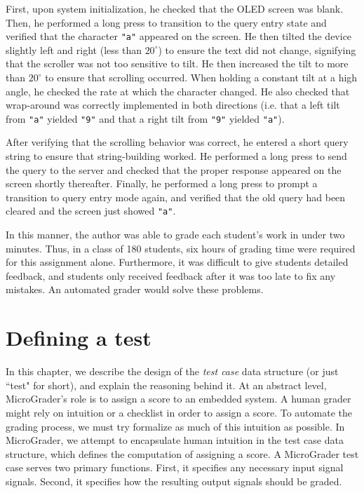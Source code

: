 \documentclass[12pt]{article}
\begin{document}
First, upon system initialization, he checked that the OLED screen was blank.  Then, he performed a long press to transition to the query entry state and verified that the character \texttt{"a"} appeared on the screen.  He then tilted the device slightly left and right (less than $20^{\circ}$) to ensure the text did not change, signifying that the scroller was not too sensitive to tilt.  He then increased the tilt to more than $20^{\circ}$ to ensure that scrolling occurred.  When holding a constant tilt at a high angle, he checked the rate at which the character changed.  He also checked that wrap-around was correctly implemented in both directions (i.e. that a left tilt from \texttt{"a"} yielded \texttt{"9"} and that a right tilt from \texttt{"9"} yielded \texttt{"a"}).

After verifying that the scrolling behavior was correct, he entered a short query string to ensure that string-building worked.  He performed a long press to send the query to the server and checked that the proper response appeared on the screen shortly thereafter.  Finally, he performed a long press to prompt a transition to query entry mode again, and verified that the old query had been cleared and the screen just showed \texttt{"a"}.

In this manner, the author was able to grade each student's work in under two minutes.  Thus, in a class of 180 students, six hours of grading time were required for this assignment alone.  Furthermore, it was difficult to give students detailed feedback, and students only received feedback after it was too late to fix any mistakes.  An automated grader would solve these problems.

\clearpage
\section{Defining a test}
In this chapter, we describe the design of the \textit{test case} data structure (or just ``test" for short), and explain the reasoning behind it.  At an abstract level, MicroGrader's role is to assign a score to an embedded system.  A human grader might rely on intuition or a checklist in order to assign a score.   To automate the grading process, we must try formalize as much of this intuition as possible.  In MicroGrader, we attempt to encapsulate human intuition in the test case data structure, which defines the computation of assigning a score.  A MicroGrader test case serves two primary functions.  First, it specifies any necessary input signal signals.  Second, it specifies how the resulting output signals should be graded.
\end{document}
